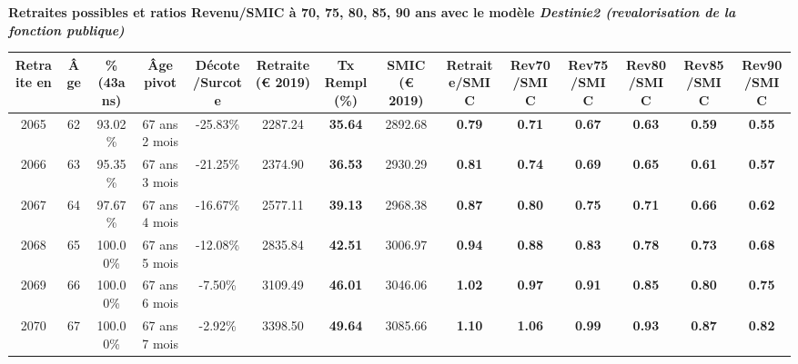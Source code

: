  \vspace{0.1cm} 
{\bf \noindent Retraites possibles et ratios Revenu/SMIC à 70, 75, 80, 85, 90 ans avec le modèle \emph{Destinie2 (revalorisation de la fonction publique)}}  
 
\begin{adjustbox}{max width=\textwidth} 
\begin{tabular}[htb]{|c|c||c|c|c||c|c||c||c|c|c|c|c|c|} 
\hline 
 Retraite en &  Âge &  \%(43ans) &  Âge pivot &  Décote/Surcote &  Retraite (\euro{} 2019) &  Tx Rempl(\%) &  SMIC (\euro{} 2019) &  Retraite/SMIC &  Rev70/SMIC &  Rev75/SMIC &  Rev80/SMIC &  Rev85/SMIC &  Rev90/SMIC \\ 
\hline \hline 
 2065 &  62 &  93.02\% &  67 ans 2 mois &  -25.83\% &  2287.24 &  {\bf 35.64} &  2892.68 &  {\bf {\color{red} 0.79}} &  {\bf {\color{red} 0.71}} &  {\bf {\color{red} 0.67}} &  {\bf {\color{red} 0.63}} &  {\bf {\color{red} 0.59}} &  {\bf {\color{red} 0.55}} \\ 
\hline 
 2066 &  63 &  95.35\% &  67 ans 3 mois &  -21.25\% &  2374.90 &  {\bf 36.53} &  2930.29 &  {\bf {\color{red} 0.81}} &  {\bf {\color{red} 0.74}} &  {\bf {\color{red} 0.69}} &  {\bf {\color{red} 0.65}} &  {\bf {\color{red} 0.61}} &  {\bf {\color{red} 0.57}} \\ 
\hline 
 2067 &  64 &  97.67\% &  67 ans 4 mois &  -16.67\% &  2577.11 &  {\bf 39.13} &  2968.38 &  {\bf {\color{red} 0.87}} &  {\bf {\color{red} 0.80}} &  {\bf {\color{red} 0.75}} &  {\bf {\color{red} 0.71}} &  {\bf {\color{red} 0.66}} &  {\bf {\color{red} 0.62}} \\ 
\hline 
 2068 &  65 &  100.00\% &  67 ans 5 mois &  -12.08\% &  2835.84 &  {\bf 42.51} &  3006.97 &  {\bf {\color{red} 0.94}} &  {\bf {\color{red} 0.88}} &  {\bf {\color{red} 0.83}} &  {\bf {\color{red} 0.78}} &  {\bf {\color{red} 0.73}} &  {\bf {\color{red} 0.68}} \\ 
\hline 
 2069 &  66 &  100.00\% &  67 ans 6 mois &  -7.50\% &  3109.49 &  {\bf 46.01} &  3046.06 &  {\bf 1.02} &  {\bf {\color{red} 0.97}} &  {\bf {\color{red} 0.91}} &  {\bf {\color{red} 0.85}} &  {\bf {\color{red} 0.80}} &  {\bf {\color{red} 0.75}} \\ 
\hline 
 2070 &  67 &  100.00\% &  67 ans 7 mois &  -2.92\% &  3398.50 &  {\bf 49.64} &  3085.66 &  {\bf 1.10} &  {\bf 1.06} &  {\bf {\color{red} 0.99}} &  {\bf {\color{red} 0.93}} &  {\bf {\color{red} 0.87}} &  {\bf {\color{red} 0.82}} \\ 
\hline 
\hline 
\end{tabular} 
\end{adjustbox} 
 
